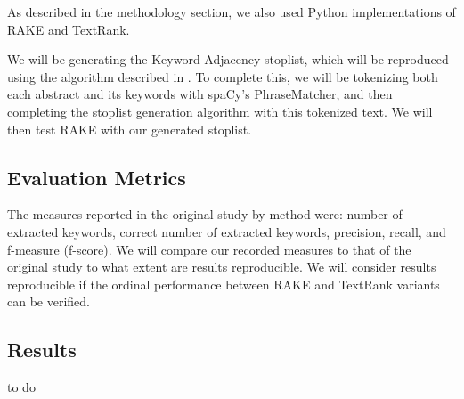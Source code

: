 \documentclass[11pt,a4paper]{article}
\begin{document}
As described in the methodology section, we also used Python implementations of RAKE and TextRank. 

We will be generating the Keyword Adjacency stoplist, which will be reproduced using the algorithm described in \citet{hulth-2003-improved}. To complete this, we will be tokenizing both each abstract and its keywords with spaCy's PhraseMatcher, and then completing the stoplist generation algorithm with this tokenized text. We will then test RAKE with our generated stoplist.

\subsection{Evaluation Metrics}

The measures reported in the original study by method were: number of extracted keywords, correct number of extracted keywords, precision, recall, and f-measure (f-score).  We will compare our recorded measures to that of the original study to what extent are  results reproducible. We will consider  results reproducible if the ordinal performance between RAKE and TextRank variants can be verified. 

\subsection{Results}
to do 
\end{document}
